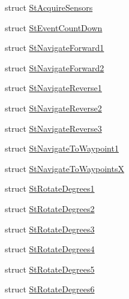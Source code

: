 \begin{DoxyCompactItemize}
struct \hyperlink{structsm__dance__bot_1_1StAcquireSensors}{St\+Acquire\+Sensors}
\item 
struct \hyperlink{structsm__dance__bot_1_1StEventCountDown}{St\+Event\+Count\+Down}
\item 
struct \hyperlink{structsm__dance__bot_1_1StNavigateForward1}{St\+Navigate\+Forward1}
\item 
struct \hyperlink{structsm__dance__bot_1_1StNavigateForward2}{St\+Navigate\+Forward2}
\item 
struct \hyperlink{structsm__dance__bot_1_1StNavigateReverse1}{St\+Navigate\+Reverse1}
\item 
struct \hyperlink{structsm__dance__bot_1_1StNavigateReverse2}{St\+Navigate\+Reverse2}
\item 
struct \hyperlink{structsm__dance__bot_1_1StNavigateReverse3}{St\+Navigate\+Reverse3}
\item 
struct \hyperlink{structsm__dance__bot_1_1StNavigateToWaypoint1}{St\+Navigate\+To\+Waypoint1}
\item 
struct \hyperlink{structsm__dance__bot_1_1StNavigateToWaypointsX}{St\+Navigate\+To\+WaypointsX}
\item 
struct \hyperlink{structsm__dance__bot_1_1StRotateDegrees1}{St\+Rotate\+Degrees1}
\item 
struct \hyperlink{structsm__dance__bot_1_1StRotateDegrees2}{St\+Rotate\+Degrees2}
\item 
struct \hyperlink{structsm__dance__bot_1_1StRotateDegrees3}{St\+Rotate\+Degrees3}
\item 
struct \hyperlink{structsm__dance__bot_1_1StRotateDegrees4}{St\+Rotate\+Degrees4}
\item 
struct \hyperlink{structsm__dance__bot_1_1StRotateDegrees5}{St\+Rotate\+Degrees5}
\item 
struct \hyperlink{structsm__dance__bot_1_1StRotateDegrees6}{St\+Rotate\+Degrees6}
\end{DoxyCompactItemize}

